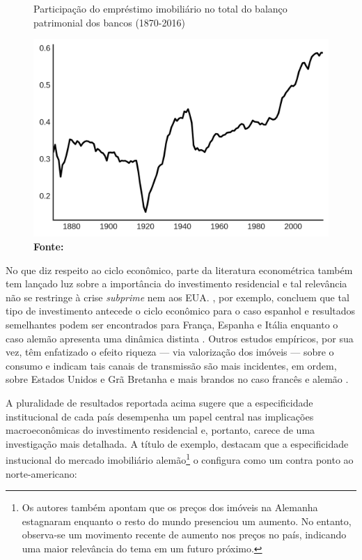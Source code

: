 \begin{figure}
	\centering
	\caption{Participação do empréstimo imobiliário no total do balanço patrimonial dos bancos (1870-2016)}
	\label{GraficoJorda}
	\includegraphics[width=.65\textwidth]{Jorda_Mean.png}
	\caption*{\textbf{Fonte:} \textcite[p.~10]{jorda_great_2014}}
\end{figure}



No que diz respeito ao ciclo econômico, parte da literatura econométrica também tem lançado luz sobre a importância do investimento residencial e tal relevância não se restringe à crise \textit{subprime} nem aos EUA. \textcite{alvarez_does_2010}, por exemplo, concluem que tal tipo de investimento antecede o ciclo econômico para o caso espanhol e resultados semelhantes podem ser encontrados para França, Espanha  e Itália enquanto o caso alemão apresenta uma dinâmica distinta \cites{ferrara_cyclical_2010}{ferrara_common_2010}. 
Outros estudos empíricos, por sua vez, têm enfatizado o efeito riqueza --- via valorização dos imóveis --- sobre o consumo e indicam tais canais de transmissão são mais incidentes, em ordem, sobre Estados Unidos e Grã Bretanha e mais brandos no caso francês e alemão \cites{sastre_assessment_2010}{chauvin_wealth_2010}{bassanetti_effects_2010}{arrondel_housing_2010}.


A pluralidade de resultados reportada acima sugere que a especificidade institucional de cada país desempenha um papel central nas implicações macroeconômicas do investimento residencial e, portanto, carece de uma investigação mais detalhada.
A título de exemplo, \textcite{wijburg_alternative_2017} destacam que a especificidade instucional do mercado imobiliário alemão\footnote{Os autores também apontam que os preços dos imóveis na Alemanha estagnaram enquanto o resto do mundo presenciou um aumento. No entanto, observa-se um movimento recente de aumento nos preços no país, indicando uma maior relevância do tema em um futuro próximo.} o configura como um contra ponto ao norte-americano:

